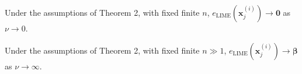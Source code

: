 \documentclass[mnsc,blindrev]{informs3}
\begin{document}

             

             
            


            \begin{corollary}
                Under the assumptions of Theorem 2, with fixed finite $n$, $e_{\text{LIME}}(\mathbf{x}^{(i)}_j) \rightarrow \mathbf{0}$ as $\nu \rightarrow 0$. 
            \end{corollary}
            
            \begin{corollary}
                Under the assumptions of Theorem 2, with fixed finite $n \gg 1$, $e_{\text{LIME}}(\mathbf{x}^{(i)}_j) \rightarrow \boldsymbol{\beta}$ as $\nu\rightarrow \infty$. 
            \end{corollary}


            
\end{document}
